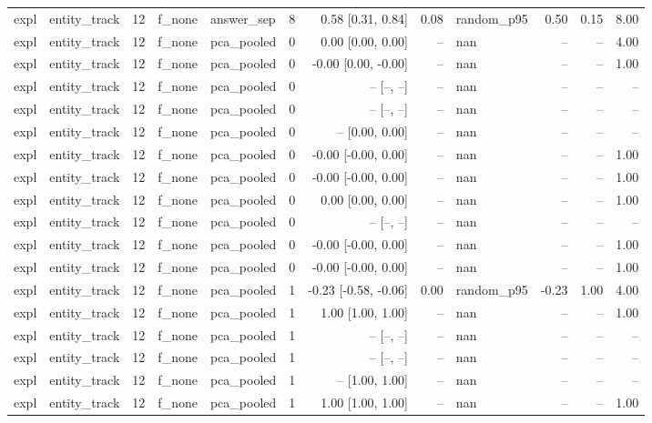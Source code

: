 \begin{tabular}{llrllrrrlrrr}
expl & entity\_track & 12 & f\_none & answer\_sep & 8 & 0.58 [0.31, 0.84] & 0.08 & random\_p95 & 0.50 & 0.15 & 8.00 \\
expl & entity\_track & 12 & f\_none & pca\_pooled & 0 & 0.00 [0.00, 0.00] & -- & nan & -- & -- & 4.00 \\
expl & entity\_track & 12 & f\_none & pca\_pooled & 0 & -0.00 [0.00, -0.00] & -- & nan & -- & -- & 1.00 \\
expl & entity\_track & 12 & f\_none & pca\_pooled & 0 & -- [--, --] & -- & nan & -- & -- & -- \\
expl & entity\_track & 12 & f\_none & pca\_pooled & 0 & -- [--, --] & -- & nan & -- & -- & -- \\
expl & entity\_track & 12 & f\_none & pca\_pooled & 0 & -- [0.00, 0.00] & -- & nan & -- & -- & -- \\
expl & entity\_track & 12 & f\_none & pca\_pooled & 0 & -0.00 [-0.00, 0.00] & -- & nan & -- & -- & 1.00 \\
expl & entity\_track & 12 & f\_none & pca\_pooled & 0 & -0.00 [-0.00, 0.00] & -- & nan & -- & -- & 1.00 \\
expl & entity\_track & 12 & f\_none & pca\_pooled & 0 & 0.00 [0.00, 0.00] & -- & nan & -- & -- & 1.00 \\
expl & entity\_track & 12 & f\_none & pca\_pooled & 0 & -- [--, --] & -- & nan & -- & -- & -- \\
expl & entity\_track & 12 & f\_none & pca\_pooled & 0 & -0.00 [-0.00, 0.00] & -- & nan & -- & -- & 1.00 \\
expl & entity\_track & 12 & f\_none & pca\_pooled & 0 & -0.00 [-0.00, 0.00] & -- & nan & -- & -- & 1.00 \\
expl & entity\_track & 12 & f\_none & pca\_pooled & 1 & -0.23 [-0.58, -0.06] & 0.00 & random\_p95 & -0.23 & 1.00 & 4.00 \\
expl & entity\_track & 12 & f\_none & pca\_pooled & 1 & 1.00 [1.00, 1.00] & -- & nan & -- & -- & 1.00 \\
expl & entity\_track & 12 & f\_none & pca\_pooled & 1 & -- [--, --] & -- & nan & -- & -- & -- \\
expl & entity\_track & 12 & f\_none & pca\_pooled & 1 & -- [--, --] & -- & nan & -- & -- & -- \\
expl & entity\_track & 12 & f\_none & pca\_pooled & 1 & -- [1.00, 1.00] & -- & nan & -- & -- & -- \\
expl & entity\_track & 12 & f\_none & pca\_pooled & 1 & 1.00 [1.00, 1.00] & -- & nan & -- & -- & 1.00 \\

\end{tabular}
